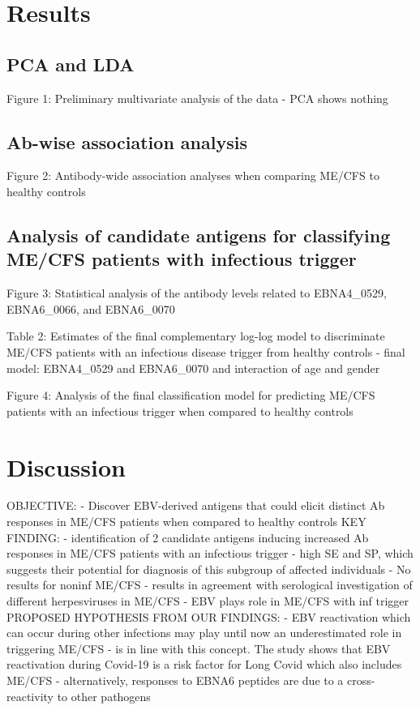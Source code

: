 \section{Results}
\subsection{PCA and LDA}

Figure 1: Preliminary multivariate analysis of the data
    - PCA shows nothing


\subsection{Ab-wise association analysis}

Figure 2: Antibody-wide association analyses when comparing ME/CFS to healthy controls


\subsection{Analysis of candidate antigens for classifying ME/CFS patients with infectious trigger}

Figure 3: Statistical analysis of the antibody levels related to EBNA4\_0529, EBNA6\_0066, and EBNA6\_0070

Table 2: Estimates of the final complementary log-log model to discriminate ME/CFS patients with an infectious disease trigger from healthy controls
    - final model: EBNA4\_0529 and EBNA6\_0070 and interaction of age and gender

Figure 4: Analysis of the final classification model for predicting ME/CFS patients with an infectious trigger when compared to healthy controls

\section{Discussion}

OBJECTIVE:
    - Discover EBV-derived antigens that could elicit distinct Ab responses in ME/CFS patients when compared to healthy controls
KEY FINDING:
    - identification of 2 candidate antigens inducing increased Ab responses in ME/CFS patients with an infectious trigger
    - high SE and SP, which suggests their potential for diagnosis of this subgroup of affected individuals
    - No results for noninf ME/CFS
    - results in agreement with serological investigation of different herpesviruses in ME/CFS \citep{blombergAntibodiesHumanHerpesviruses2019}
    - EBV plays role in ME/CFS with inf trigger
PROPOSED HYPOTHESIS FROM OUR FINDINGS:
    - EBV reactivation which can occur during other infections may play until now an underestimated role in triggering ME/CFS
    - \citet{su2022MultipleEarly} is in line with this concept. The study shows that EBV reactivation during Covid-19 is a risk factor for Long Covid which also includes ME/CFS
    - alternatively, responses to EBNA6 peptides are due to a cross-reactivity to other pathogens

